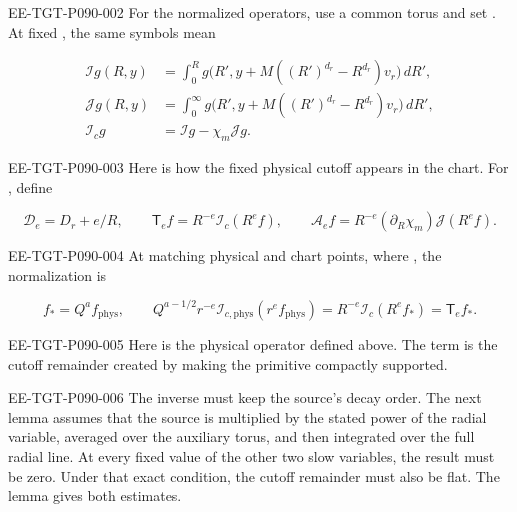 \begin{EESegment}{EE-TGT-P090-002}
For the normalized operators, use a common torus  and set
. At fixed
, the same symbols mean
\end{EESegment}
\begin{equation}
\begin{aligned}
  \mathcal I g(R,y)
    &=\int_0^R g\bigl(R',y+M((R')^{d_r}-R^{d_r})v_r\bigr)\,dR',\\
  \mathcal J g(R,y)
    &=\int_0^\infty g\bigl(R',y+M((R')^{d_r}-R^{d_r})v_r\bigr)\,dR',\\
  \mathcal I_c g&=\mathcal I g-\chi_m\mathcal J g.
\end{aligned}
\tag{8.5}\label{eq:8.5}
\end{equation}
\begin{EESegment}{EE-TGT-P090-003}
Here  is how the fixed physical cutoff appears in
the chart. For , define
\end{EESegment}
\begin{equation}
  \mathcal D_e=D_r+e/R,
  \qquad \mathsf T_e f=R^{-e}\mathcal I_c(R^e f),
  \qquad \mathcal A_e f=R^{-e}(\partial_R\chi_m)\mathcal J(R^e f).
\tag{8.6}\label{eq:8.6}
\end{equation}
\begin{EESegment}{EE-TGT-P090-004}
At matching physical and chart points, where
, the normalization is
\end{EESegment}
\[
  f_*=Q^a f_{\mathrm{phys}},
  \qquad
  Q^{a-1/2}r^{-e}\mathcal I_{c,\mathrm{phys}}(r^e f_{\mathrm{phys}})
   =R^{-e}\mathcal I_c(R^e f_*)=\mathsf T_e f_*.
\]
\begin{EESegment}{EE-TGT-P090-005}
Here  is the physical operator defined above.
The term  is the cutoff remainder created by making the
primitive compactly supported.
\end{EESegment}

\begin{EESegment}{EE-TGT-P090-006}
The inverse must keep the source's decay order. The next lemma assumes that the source is multiplied
by the stated power of the radial variable, averaged over the auxiliary torus, and then integrated
over the full radial line. At every fixed value of the other two slow variables, the result must be
zero. Under that exact condition, the cutoff remainder must also be flat. The lemma gives both
estimates.
\end{EESegment}

